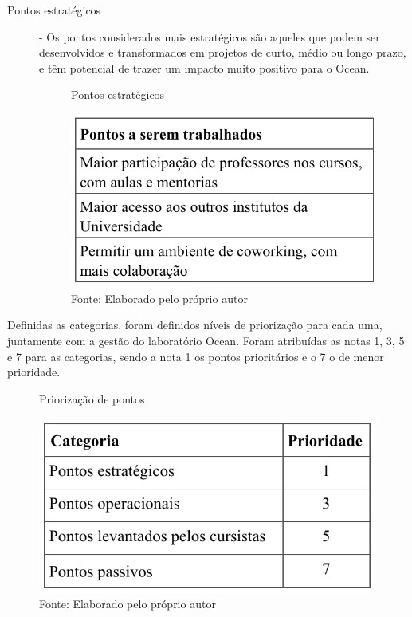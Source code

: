 \begin{description}
\item[Pontos estratégicos] - Os pontos considerados mais estratégicos são aqueles que podem ser desenvolvidos e transformados em projetos de curto, médio ou longo prazo, e têm potencial de trazer um impacto muito positivo para o Ocean.

\begin{figure}[H]
\caption{Pontos estratégicos}
\centerline{\includegraphics[scale=0.75]{img/pontosselecionadosestrategicos}}
\label{fig:pontosselecionadosestrategicos}
\caption* {Fonte: Elaborado pelo próprio autor}
\end{figure}

\end{description}

Definidas as categorias, foram definidos níveis de priorização para cada uma, juntamente com a gestão do laboratório Ocean. Foram atribuídas as notas 1, 3, 5 e 7 para as categorias, sendo a nota 1 os pontos prioritários e o 7 o de menor prioridade.


\begin{figure}[H]
\caption{Priorização de pontos}
\centerline{\includegraphics[scale=0.75]{img/priorizacao}}
\label{fig:priorizacao}
\caption* {Fonte: Elaborado pelo próprio autor}
\end{figure}

